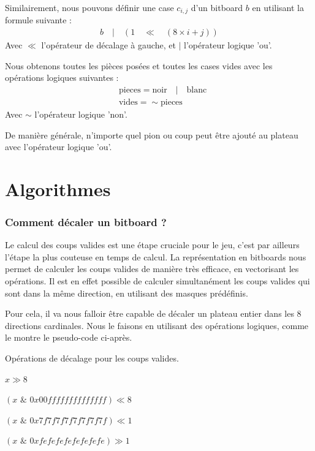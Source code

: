 Similairement, nous pouvons définir une case $c_{i,j}$ d'un bitboard $b$ en utilisant la formule suivante :
\begin{align*}
    b\quad |\quad (1\quad \ll\quad (8\times i+j))
\end{align*}
Avec $\ll$ l'opérateur de décalage à gauche, et $|$ l'opérateur logique 'ou'.

Nous obtenons toutes les pièces posées et toutes les cases vides avec les opérations logiques suivantes :
\begin{align*}
    &\text{pieces} = \text{noir} \quad | \quad \text{blanc} \\
    &\text{vides} = \sim \text{pieces}
\end{align*}
Avec $\sim$ l'opérateur logique 'non'.

De manière générale, n'importe quel pion ou coup peut être ajouté au plateau avec l'opérateur logique 'ou'.


\section{Algorithmes}
\label{sec:algo}

\subsubsection{Comment décaler un bitboard ?}
\label{subsec:shift}
Le calcul des coups valides est une étape cruciale pour le jeu, c'est par ailleurs l'étape la plus couteuse en temps de calcul. La représentation en bitboards nous permet de calculer les coups valides de manière très efficace, en vectorisant les opérations. Il est en effet possible de calculer simultanément les coups valides qui sont dans la même direction, en utilisant des masques prédéfinis. 

Pour cela, il va nous falloir être capable de décaler un plateau entier dans les 8 directions cardinales. Nous le faisons en utilisant des opérations logiques, comme le montre le pseudo-code ci-après.
\begin{algorithm}
    \caption{Opérations de décalage pour les coups valides.}
    \begin{algorithmic}[1]
        \State \Return $x \gg 8$
    \EndFunction
    
        \State \Return $(x \,\, \& \,\, 0x00ffffffffffffff) \ll 8$
    \EndFunction
    
        \State \Return $(x \,\, \& \,\, 0x7f7f7f7f7f7f7f7f) \ll 1$
    \EndFunction
    
        \State \Return $(x \,\, \& \,\, 0xfefefefefefefefe) \gg 1$
    \EndFunction
    \end{algorithmic}
    \label{alg:shift_ops}
\end{algorithm}

